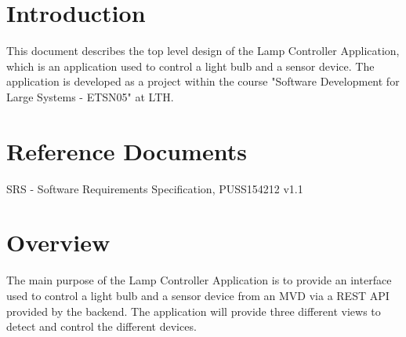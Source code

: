 \documentclass[a4paper]{article}
\begin{document}
	
	\tableofcontents
	\newpage
	
	\section{Introduction}
	This document describes the top level design of the Lamp Controller Application, which is an application used to control a light bulb and a sensor device. The application is developed as a project within the course "Software Development for Large Systems - ETSN05" at LTH.
	
	\section{Reference Documents}
	SRS - Software Requirements Specification, PUSS154212 v1.1
	
	
	\section{Overview}
	The main purpose of the Lamp Controller Application is to provide an interface used to control a light bulb and a sensor device from an MVD via a REST API provided by the backend. The application will provide three different views to detect and control the different devices.
	
\end{document}
